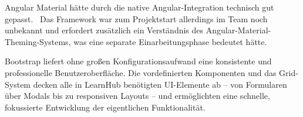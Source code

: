 Angular Material hätte durch die native Angular-Integration technisch
gut gepasst.~\cite{angular-material} Das Framework war zum Projektstart
allerdings im Team noch unbekannt und erfordert zusätzlich ein Verständnis
des Angular-Material-Theming-Systems, was eine separate Einarbeitungsphase
bedeutet hätte.

Bootstrap liefert ohne großen Konfigurationsaufwand eine konsistente
und professionelle Benutzeroberfläche. Die vordefinierten Komponenten
und das Grid-System decken alle in LearnHub benötigten UI-Elemente ab --
von Formularen über Modals bis zu responsiven Layouts -- und ermöglichten
eine schnelle, fokussierte Entwicklung der eigentlichen Funktionalität.

\setauthor{\firstauthor}